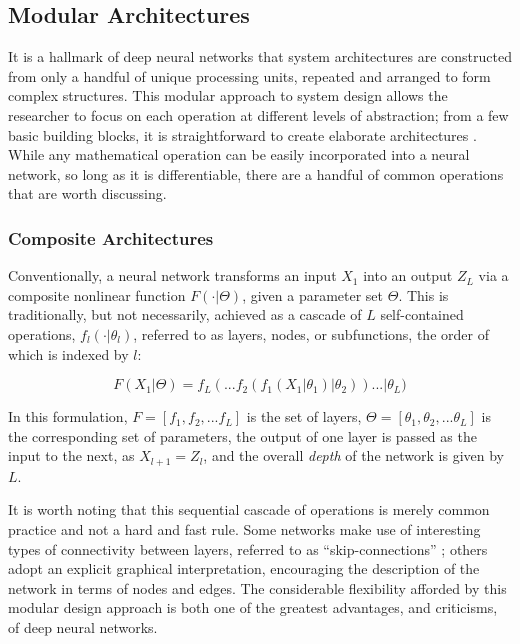 \subsection{Modular Architectures}
\label{subsec:architectures}

It is a hallmark of deep neural networks that system architectures are constructed from only a handful of unique processing units, repeated and arranged to form complex structures.
This modular approach to system design allows the researcher to focus on each operation at different levels of abstraction;
from a few basic building blocks, it is straightforward to create elaborate architectures \cite{inceptionnet}.
While any mathematical operation can be easily incorporated into a neural network, so long as it is differentiable, there are a handful of common operations that are worth discussing.

\subsubsection{Composite Architectures}

Conventionally, a neural network transforms an input $X_{1}$ into an output $Z_{L}$ via a composite nonlinear function $F(\cdot \vert \Theta)$, given a parameter set $\Theta$.
This is traditionally, but not necessarily, achieved as a cascade of $L$ self-contained operations, $f_l(\cdot \vert \theta_l)$, referred to as layers, nodes, or subfunctions, the order of which is indexed by $l$:

\begin{equation}
\label{eq:layers}
F(X_{1} \vert \Theta) = f_{L}(  ... f_2(f_1(X_{1} \vert \theta_1) \vert \theta_2) ) ... \vert \theta_{L})
\end{equation}

\noindent In this formulation, $F = [f_1, f_2, ... f_{L} ]$ is the set of layers, $\Theta = [\theta_1, \theta_2, ... \theta_{L} ]$ is the corresponding set of parameters, the output of one layer is passed as the input to the next, as $X_{l+1} = Z_{l}$, and the overall \emph{depth} of the network is given by $L$.

It is worth noting that this sequential cascade of operations is merely common practice and not a hard and fast rule.
Some networks make use of interesting types of connectivity between layers, referred to as ``skip-connections'' \cite{LeCun};
others adopt an explicit graphical interpretation, encouraging the description of the network in terms of nodes and edges.
The considerable flexibility afforded by this modular design approach is both one of the greatest advantages, and criticisms, of deep neural networks.

